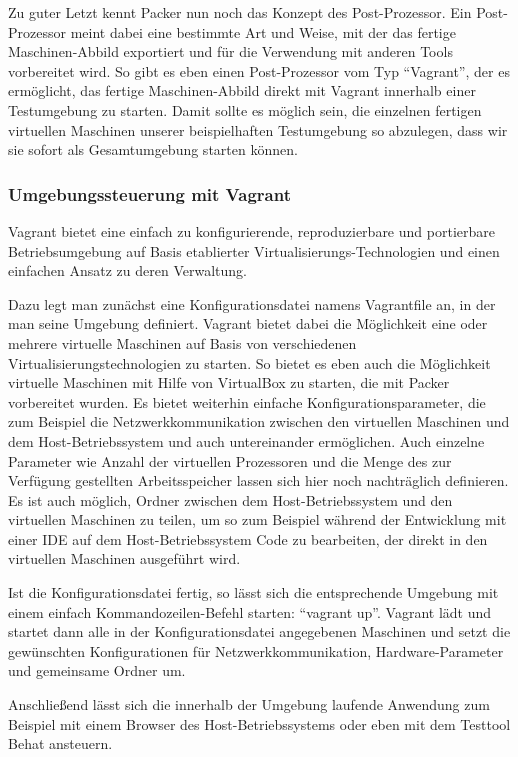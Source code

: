 Zu guter Letzt kennt Packer nun noch das Konzept des Post-Prozessor. Ein Post-Prozessor meint dabei eine bestimmte Art und Weise, mit der das fertige Maschinen-Abbild exportiert und für die Verwendung mit anderen Tools vorbereitet wird. So gibt es eben einen Post-Prozessor vom Typ "`Vagrant"', der es ermöglicht, das fertige Maschinen-Abbild direkt mit Vagrant innerhalb einer Testumgebung zu starten. Damit sollte es möglich sein, die einzelnen fertigen virtuellen Maschinen unserer beispielhaften Testumgebung so abzulegen, dass wir sie sofort als Gesamtumgebung starten können.

\subsubsection{Umgebungssteuerung mit Vagrant}

Vagrant bietet eine einfach zu konfigurierende, reproduzierbare und portierbare Betriebsumgebung auf Basis etablierter Virtualisierungs-Technologien und einen einfachen Ansatz zu deren Verwaltung.

Dazu legt man zunächst eine Konfigurationsdatei namens Vagrantfile an, in der man seine Umgebung definiert. Vagrant bietet dabei die Möglichkeit eine oder mehrere virtuelle Maschinen auf Basis von verschiedenen Virtualisierungstechnologien zu starten. So bietet es eben auch die Möglichkeit virtuelle Maschinen mit Hilfe von VirtualBox zu starten, die mit Packer vorbereitet wurden. Es bietet weiterhin einfache Konfigurationsparameter, die zum Beispiel die Netzwerkkommunikation zwischen den virtuellen Maschinen und dem Host-Betriebssystem und auch untereinander ermöglichen. Auch einzelne Parameter wie Anzahl der virtuellen Prozessoren und die Menge des zur Verfügung gestellten Arbeitsspeicher lassen sich hier noch nachträglich definieren. Es ist auch möglich, Ordner zwischen dem Host-Betriebssystem und den virtuellen Maschinen zu teilen, um so zum Beispiel während der Entwicklung mit einer IDE auf dem Host-Betriebssystem Code zu bearbeiten, der direkt in den virtuellen Maschinen ausgeführt wird.

Ist die Konfigurationsdatei fertig, so lässt sich die entsprechende Umgebung mit einem einfach Kommandozeilen-Befehl starten: "`vagrant up"'. Vagrant lädt und startet dann alle in der Konfigurationsdatei angegebenen Maschinen und setzt die gewünschten Konfigurationen für Netzwerkkommunikation, Hardware-Parameter und gemeinsame Ordner um.

Anschließend lässt sich die innerhalb der Umgebung laufende Anwendung zum Beispiel mit einem Browser des Host-Betriebssystems oder eben mit dem Testtool Behat ansteuern.

